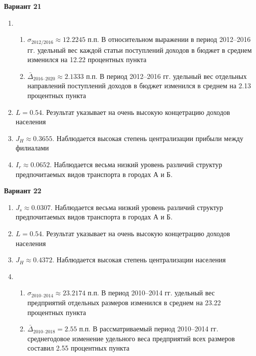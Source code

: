 \documentclass{article}
\begin{document}
\textbf{Вариант 21}
\begin{enumerate}
\item \begin{enumerate} \item $\sigma_\text{2012/2016}\approx 12.2245$ п.п. В относительном выражении в период 2012--2016 гг. удельный вес каждой статьи поступлений доходов в бюджет в среднем изменился на 12.22 процентных пункта
\item $\bar\Delta_\text{2016--2020}\approx 2.1333$ п.п. В период 2012--2016 гг. удельный вес отдельных направлений поступлений доходов в бюджет изменился в среднем на 2.13 процентных пункта\end{enumerate}
\item $L= 0.54$. Результат указывает на очень высокую концетрацию доходов населения
\item $J_H \approx 0.3655$. Наблюдается высокая степень централизации прибыли между филиалами
\item $I_r\approx 0.0652$. Наблюдается весьма низкий уровень различий структур предпочитаемых видов транспорта в городах А и Б.
\end{enumerate}

\textbf{Вариант 22}
\begin{enumerate}
\item $J_s\approx 0.0307$. Наблюдается весьма низкий уровень различий структур предпочитаемых видов транспорта в городах А и Б.
\item $L= 0.54$. Результат указывает на очень высокую концетрацию доходов населения
\item $J_H \approx 0.4372$. Наблюдается высокая степень централизации населения
\item \begin{enumerate} \item $\sigma_\text{2010--2014}\approx 23.2174$ п.п. В период 2010--2014 гг. удельный вес предприятий отдельных размеров изменился в среднем на 23.22 процентных пункта
\item $\bar\Delta_\text{2010--2018}= 2.55$ п.п. В рассматриваемый период 2010--2014 гг. среднегодовое изменение удельного веса предприятий всех размеров составил 2.55 процентных пункта\end{enumerate}
\end{enumerate}
\end{document}
